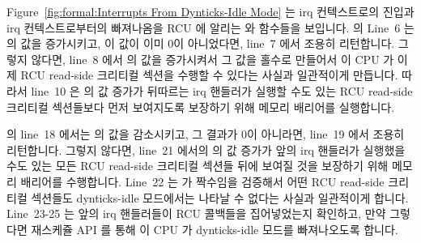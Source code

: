 Figure~\ref{fig:formal:Interrupts From Dynticks-Idle Mode}
는 irq 컨텍스트로의 진입과 irq 컨텍스트로부터의 빠져나옴을 RCU 에 알리는
 와  함수들을 보입니다.
 의 Line~6 는  의 값을 증가시키고, 이
값이 이미 0이 아니었다면, line~7 에서 조용히 리턴합니다.
그렇지 않다면, line~8 에서  의 값을 증가시켜서 그 값을 홀수로
만들어서 이 CPU 가 이제 RCU read-side 크리티컬 섹션을 수행할 수 있다는 사실과
일관적이게 만듭니다.
따라서 line~10 은  의 값 증가가 뒤따르는 irq 핸들러가 실행할 수도
있는 RCU read-side 크리티컬 섹션들보다 먼저 보여지도록 보장하기 위해 메모리
배리어를 실행합니다.
\iffalse

Figure~\ref{fig:formal:Interrupts From Dynticks-Idle Mode}
shows \co{rcu_irq_enter()} and \co{rcu_irq_exit()}, which
inform RCU of entry to and exit from, respectively, irq context.
Line~6 of \co{rcu_irq_enter()} increments \co{dynticks_nesting},
and if this variable was already non-zero, line~7 silently returns.
Otherwise, line~8 increments \co{dynticks}, which will then have
an odd value, consistent with the fact that this CPU can now
execute RCU read-side critical sections.
Line~10 therefore executes a memory barrier to ensure that
the increment of \co{dynticks} is seen before any
RCU read-side critical sections that the subsequent irq handler
might execute.
\fi

 의 line~18 에서는  의 값을 감소시키고,
그 결과가 0이 아니라면, line~19 에서 조용히 리턴합니다.
그렇지 않다면, line~21 에서의  의 값 증가가 앞의 irq 핸들러가
실행했을 수도 있는 모든 RCU read-side 크리티컬 섹션들 뒤에 보여질 것을 보장하기
위해 메모리 배리어를 수행합니다.
Line~22 는  가 짝수임을 검증해서 어떤 RCU read-side 크리티컬
섹션들도 dynticks-idle 모드에서는 나타날 수 없다는 사실과 일관적이게 합니다.
Line~23-25 는 앞의 irq 핸들러들이 RCU 콜백들을 집어넣었는지 확인하고, 만약
그렇다면 재스케쥴 API 를 통해 이 CPU 가 dynticks-idle 모드를 빠져나오도록
합니다.
\iffalse

Line~18 of \co{rcu_irq_exit()} decrements \co{dynticks_nesting}, and
if the result is non-zero, line~19 silently returns.
Otherwise, line~20 executes a memory barrier to ensure that the
increment of \co{dynticks} on line~21 is seen after any RCU
read-side critical sections that the prior irq handler might have executed.
Line~22 verifies that \co{dynticks} is now even, consistent with
the fact that no RCU read-side critical sections may appear in
dynticks-idle mode.
Lines~23-25 check to see if the prior irq handlers enqueued any
RCU callbacks, forcing this CPU out of dynticks-idle mode via
a reschedule API if so.
\fi

